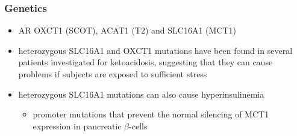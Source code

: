 \documentclass[12pt]{scrartcl}
\begin{document}
\subsubsection{Genetics}
\label{sec:org3337574}
\begin{itemize}
\item AR  OXCT1 (SCOT), ACAT1 (T2) and SLC16A1 (MCT1)
\item heterozygous SLC16A1 and OXCT1 mutations have been found in several
patients investigated for ketoacidosis, suggesting that they can
cause problems if subjects are exposed to sufficient stress

\item heterozygous SLC16A1 mutations can also cause hyperinsulinemia
\begin{itemize}
\item promoter mutations that prevent the normal silencing of MCT1
expression in pancreatic \(\beta\)-cells
\end{itemize}
\end{itemize}
\end{document}

